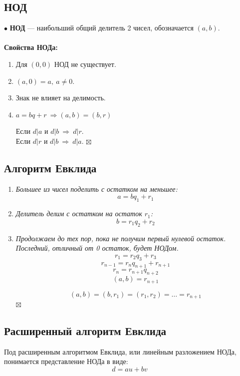 \documentclass[a4paper, 12pt]{article}
\newenvironment{Proof}
{\par\noindent{$\blacklozenge$}}
{\hfill$\scriptstyle\boxtimes$}
\begin{document}
    \subsection{НОД}
    $\bullet$ \textbf{НОД} --- наибольший общий делитель 2 чисел, обозначается $(a, b)$.\\\\
    \textbf{Свойства НОДа:}
    \begin{enumerate}
        \item Для $(0, 0)$ НОД не существует.
        \item $(a, 0) = a, \ a \neq 0$.
        \item Знак не влияет на делимость.
        \item $a=bq+r \ \Rightarrow (a,b)=(b,r)$
        \begin{Proof}
        Если $d|a$ и $d|b \ \Rightarrow \ d|r$.\\
        Если $d|r$ и $d|b \ \Rightarrow \ d|a$.
        \end{Proof}
    \end{enumerate}
    \subsection{Алгоритм Евклида}
    \begin{enumerate}
        \item \textit{Большее из чисел поделить с остатком на меньшее:}
        $$a=bq_1+r_1$$
        \item \textit{Делитель делим с остатком на остаток $r_1$:}
        $$b=r_1q_2+r_2$$
        \item \textit{Продолжаем до тех пор, пока не получим первый нулевой остаток. Последний, отличный от 0 остаток, будет НОДом.}
        $$r_1=r_2q_3+r_3$$
        $$r_{n-1}=r_nq_{n+1}+r_{n+1}$$
        $$r_n=r_{n+1}q_{n+2}$$
        $$(a,b)=r_{n+1}$$
        \begin{Proof}
        $$(a,b)=(b,r_1)=(r_1,r_2)=\dots=r_{n+1}$$
        \end{Proof}
    \end{enumerate}
    \subsection{Расширенный алгоритм Евклида}
    Под расширенным алгоритмом Евклида, или линейным разложением НОДа, понимается представление НОДа в виде:
    $$d=au+bv$$
\end{document}
